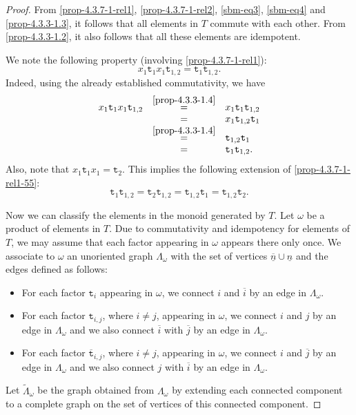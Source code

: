 \documentclass[a4paper]{amsart}
\begin{document}
\begin{proof}
From \eqref{prop-4.3.7-1-rel1}, \eqref{prop-4.3.7-1-rel2}, 
\eqref{sbm-eq3}, \eqref{sbm-eq4} and \eqref{prop-4.3.3-1.3},
it follows that all elements in $T$ commute with each other. 
From \eqref{prop-4.3.3-1.2}, it also follows that all these elements
are idempotent.

We note the following property
(involving \eqref{prop-4.3.7-1-rel1}):
\begin{equation}
\label{prop-4.3.7-1-rel1-55}
x_1\mathtt{t}_1x_1\mathtt{t}_{1,2}=\mathtt{t}_1\mathtt{t}_{1,2}.
\end{equation}
Indeed, using the already established commutativity, we have
\begin{displaymath}
\begin{array}{rcl}
x_1\mathtt{t}_1x_1\mathtt{t}_{1,2}&\overset{\eqref{prop-4.3.3-1.4}}{=}&
x_1\mathtt{t}_1\mathtt{t}_{1,2}\\
&=&
x_1\mathtt{t}_{1,2}\mathtt{t}_1\\
&\overset{\eqref{prop-4.3.3-1.4}}{=}&
\mathtt{t}_{1,2}\mathtt{t}_1\\
&=&\mathtt{t}_1\mathtt{t}_{1,2}.
\end{array}
\end{displaymath}
Also, note that $x_1\mathtt{t}_1x_1=\mathtt{t}_2$. This implies
the following extension of \eqref{prop-4.3.7-1-rel1-55}:
\begin{equation}\label{prop-4.3.7-1-rel1-55-2}
\mathtt{t}_1\mathtt{t}_{1,2}=\mathtt{t}_2\mathtt{t}_{1,2}=
\mathtt{t}_{1,2}\mathtt{t}_1=\mathtt{t}_{1,2}\mathtt{t}_2.
\end{equation}

Now we can classify the elements in the monoid 
generated by $T$. Let $\omega$ be a product of elements 
in $T$. Due to commutativity and idempotency for elements of 
$T$, we may assume  that each factor appearing in $\omega$ 
appears there only once. We associate to  $\omega$ an 
unoriented graph $\Lambda_\omega$ with the set of 
vertices $\overline{\underline{n}}\cup\underline{n}$
and the edges defined as follows:
\begin{itemize}
\item  For each factor $\mathtt{t}_i$ appearing in $\omega$,
we connect $i$ and $\overline{i}$ by an edge in $\Lambda_\omega$.
\item  For each factor $\mathtt{t}_{i,j}$, where $i\neq j$, 
appearing in $\omega$, we connect $i$ and $j$ by an edge in $\Lambda_\omega$
and we also connect $\overline{i}$ with $\overline{j}$ by an edge in $\Lambda_\omega$.
\item  For each factor $\overline{\mathtt{t}}_{i,j}$, where $i\neq j$, 
appearing in $\omega$, we connect $i$ and $\overline{j}$ by an edge in $\Lambda_\omega$
and we also connect $j$ with $\overline{i}$ by an edge in $\Lambda_\omega$.
\end{itemize}
Let $\tilde{\Lambda}_\omega$ be the graph obtained from 
$\Lambda_\omega$ by extending each connected component to a
complete graph on the set of vertices of this connected component. 


\end{proof}
\end{document}
